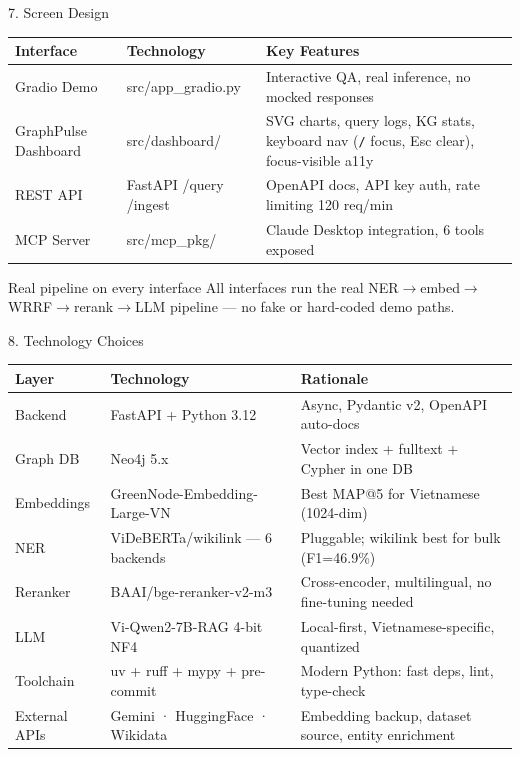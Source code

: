 \documentclass[aspectratio=169]{beamer}
\begin{document}
\begin{frame}[shrink=5]{7. Screen Design}
\begin{tabular}{@{}llp{5.2cm}@{}}
\toprule
\textbf{Interface} & \textbf{Technology} & \textbf{Key Features} \\
\midrule
Gradio Demo          & src/app\_gradio.py     & Interactive QA, real inference, no mocked responses \\
GraphPulse Dashboard & src/dashboard/         & SVG charts, query logs, KG stats, keyboard nav (\texttt{/} focus, Esc clear), focus-visible a11y \\
REST API             & FastAPI /query /ingest & OpenAPI docs, API key auth, rate limiting 120 req/min \\
MCP Server           & src/mcp\_pkg/          & Claude Desktop integration, 6 tools exposed \\
\bottomrule
\end{tabular}

\begin{exampleblock}{Real pipeline on every interface}
{\small All interfaces run the real NER$\to$embed$\to$WRRF$\to$rerank$\to$LLM
pipeline --- no fake or hard-coded demo paths.}
\end{exampleblock}
\end{frame}

\begin{frame}[shrink=5]{8. Technology Choices}
\begin{tabular}{@{}llp{5.8cm}@{}}
\toprule
\textbf{Layer} & \textbf{Technology} & \textbf{Rationale} \\
\midrule
Backend      & FastAPI + Python 3.12             & Async, Pydantic v2, OpenAPI auto-docs \\
Graph DB     & Neo4j 5.x                         & Vector index + fulltext + Cypher in one DB \\
Embeddings   & GreenNode-Embedding-Large-VN      & Best MAP@5 for Vietnamese (1024-dim) \\
NER          & ViDeBERTa/wikilink --- 6 backends & Pluggable; wikilink best for bulk (F1=46.9\%) \\
Reranker     & BAAI/bge-reranker-v2-m3           & Cross-encoder, multilingual, no fine-tuning needed \\
LLM          & Vi-Qwen2-7B-RAG 4-bit NF4        & Local-first, Vietnamese-specific, quantized \\
Toolchain    & uv + ruff + mypy + pre-commit     & Modern Python: fast deps, lint, type-check \\
External APIs & Gemini · HuggingFace · Wikidata  & Embedding backup, dataset source, entity enrichment \\
\bottomrule
\end{tabular}
\end{frame}
\end{document}
